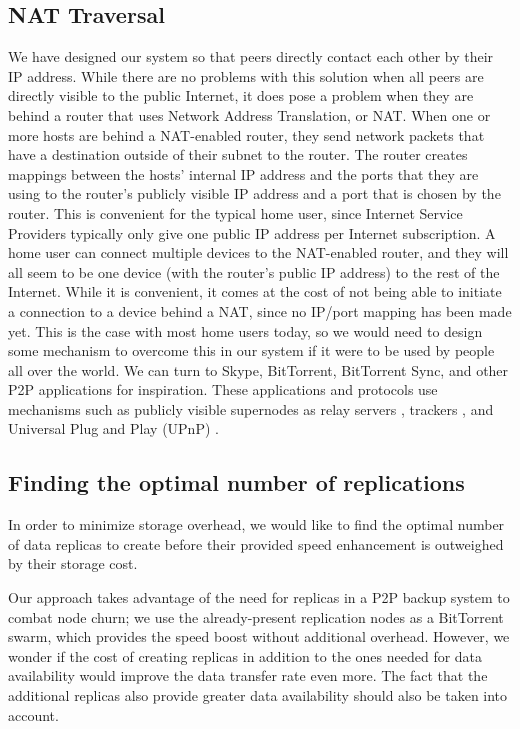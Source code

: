 \documentclass[12pt]{report}
\begin{document}
\subsection{NAT Traversal}

We have designed our system so that peers directly contact each other by their IP address. While there are no problems with this solution when all peers are directly visible to the public Internet, it does pose a problem when they are behind a router that uses Network Address Translation, or NAT. When one or more hosts are behind a NAT-enabled router, they send network packets that have a destination outside of their subnet to the router. The router creates mappings between the hosts' internal IP address and the ports that they are using to the router's publicly visible IP address and a port that is chosen by the router. This is convenient for the typical home user, since Internet Service Providers typically only give one public IP address per Internet subscription. A home user can connect multiple devices to the NAT-enabled router, and they will all seem to be one device (with the router's public IP address) to the rest of the Internet. While it is convenient, it comes at the cost of not being able to initiate a connection to a device behind a NAT, since no IP/port mapping has been made yet. This is the case with most home users today, so we would need to design some mechanism to overcome this in our system if it were to be used by people all over the world. We can turn to Skype, BitTorrent, BitTorrent Sync, and other P2P applications for inspiration. These applications and protocols use mechanisms such as publicly visible supernodes as relay servers \cite{skypeSupernode}, trackers \cite{bittorrentProtocol}, and Universal Plug and Play (UPnP) \cite{btsynctech}.

\subsection{Finding the optimal number of replications}

In order to minimize storage overhead, we would like to find the optimal number of data replicas to create before their provided speed enhancement is outweighed by their storage cost.

Our approach takes advantage of the need for replicas in a P2P backup system to combat node churn; we use the already-present replication nodes as a BitTorrent swarm, which provides the speed boost without additional overhead. However, we wonder if the cost of creating replicas in addition to the ones needed for data availability would improve the data transfer rate even more. The fact that the additional replicas also provide greater data availability should also be taken into account.
\end{document}
